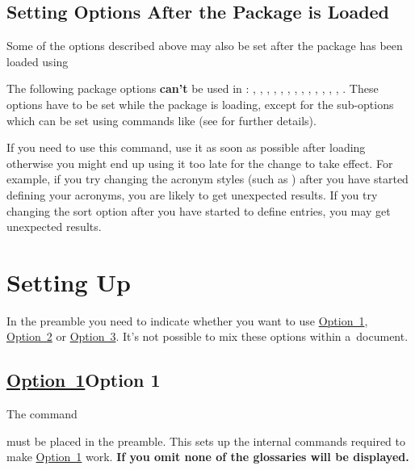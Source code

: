 \documentclass[report,inlinetitle]{nlctdoc}
\newcommand*{\opt}[1]{\hyperlink{option#1}{Option~#1}}
\begin{document}
\section{Setting Options After the Package is Loaded}
\label{sec:setupglossaries}

Some of the options described above may also be set after the
 package has been loaded using
\begin{definition}[\DescribeMacro{\setupglossaries}]
\end{definition}
The following package options \textbf{can't} be used in
: , ,
, ,
, , ,
, , ,
, , , 
. These options have to be set while the package is
loading, except for the  sub-options which can be set
using commands like  (see
 for further details).

\begin{important}
If you need to use this command, use it as soon as
possible after loading  otherwise you might 
end up using it too late for the change to take effect. For example, 
if you try changing the acronym styles (such as ) 
after you have started defining your acronyms, you are likely to get 
unexpected results. If you try changing the sort option after you have 
started to define entries, you may get unexpected results.
\end{important}

\chapter{Setting Up}
\label{sec:setup}

In the preamble you need to indicate whether you want to use \opt1,
\opt2 or \opt3. It's not possible to mix these options within
a~document.

\section[Option 1]{\ifpdf\opt1\else Option 1\fi}
\label{sec:setupopt1}

The command
\begin{definition}[\DescribeMacro{\makenoidxglossaries}]
\end{definition}
must be placed in the preamble. This sets up the internal commands
required to make \opt1 work.
\textbf{If you omit  none of
the glossaries will be displayed.}
\end{document}
